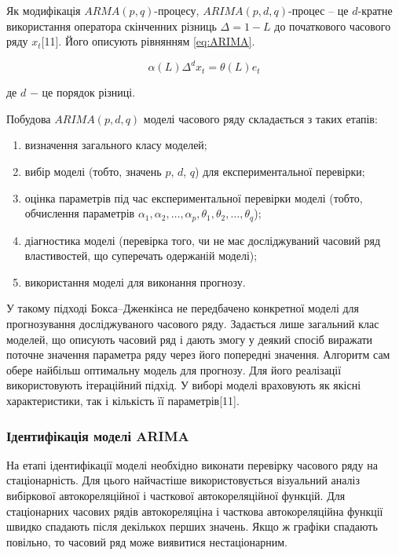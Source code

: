 Як модифікація $ARMA(p,q)$-процесу, $ARIMA(p,d,q)$-процес $–$ це $d$-кратне використання оператора скінченних різниць $\Delta=1-L$ до початкового часового ряду $x_{t}$[11]. Його описують рівнянням \ref{eq:ARIMA}.

\begin{equation}\label{eq:ARIMA}
\alpha(L)\Delta^{d}x_{t} = \theta(L)e_{t}
\end{equation}

\noindent де $d$ $-$ це порядок різниці.

Побудова $ARIMA(p,d,q)$ моделі часового ряду складається з таких етапів:

\begin{enumerate}
	\item визначення загального класу моделей;
	\item вибір моделі (тобто, значень $p$, $d$, $q$) для експериментальної перевірки;
	\item оцінка параметрів під час експериментальної перевірки моделі (тобто, обчислення параметрів $\alpha_{1}, \alpha_{2}, \dots, \alpha_{p}, \theta_{1}, \theta_{2}, \dots, \theta_{q}$);
	\item діагностика моделі (перевірка того, чи не має досліджуваний часовий ряд властивостей, що суперечать одержаній моделі);
	\item використання моделі для виконання прогнозу. 
\end{enumerate}

У такому підході Бокса–Дженкінса не передбачено конкретної моделі для прогнозування досліджуваного часового ряду. Задається лише загальний клас моделей, що описують часовий ряд і дають змогу у деякий спосіб виражати поточне значення параметра ряду через його попередні значення. Алгоритм сам обере найбільш оптимальну модель для прогнозу. Для його реалізації використовують ітераційний підхід. У виборі моделі враховують як якісні характеристики, так і кількість її параметрів[11]. 

\subsubsection{Ідентифікація моделі ARIMA}

На етапі ідентифікації моделі необхідно виконати перевірку часового ряду на стаціонарність. Для цього найчастіше використовується візуальний аналіз вибіркової автокореляційної і часткової автокореляційної функцій. Для стаціонарних часових рядів автокореляціна і часткова автокореляційна функції швидко спадають після декількох перших значень. Якщо ж графіки спадають повільно, то часовий ряд може виявитися нестаціонарним. 

